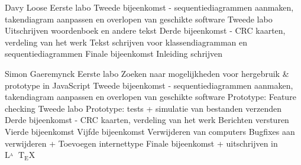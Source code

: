 \documentclass[a4paper,oneside]{report}
\def\latex{$\mathrm{L\!\!^{{}_{\scriptstyle A}} \!\!\!\!\!\;\; T\!_{\displaystyle E} \!
X}$}
\begin{document}
\begin{studentlog}{Davy Loose}
{Eerste labo}
{Tweede bijeenkomst - sequentiediagrammen aanmaken, takendiagram aanpassen en overlopen van geschikte software}
{Tweede labo}
{Uitschrijven woordenboek en andere tekst}
{Derde bijeenkomst - CRC kaarten, verdeling van het werk}
{Tekst schrijven voor klassendiagramman en sequentiediagrammen}
{Finale bijeenkomst}
{Inleiding schrijven}
\end{studentlog}

\begin{studentlog}{Simon Gaeremynck}
{Eerste labo}
{Zoeken naar mogelijkheden voor hergebruik \& prototype in JavaScript}
{Tweede bijeenkomst - sequentiediagrammen aanmaken, takendiagram aanpassen en overlopen van geschikte software}
{Prototype: Feature checking}
{Tweede labo}
{Prototype: tests + simulatie van bestanden verzenden}
{Derde bijeenkomst - CRC kaarten, verdeling van het werk}
{Berichten versturen}
{Vierde bijeenkomst}
{Vijfde bijeenkomst}
{Verwijderen van computers}
{Bugfixes aan verwijderen + Toevoegen internettype}
{Finale bijeenkomst + uitschrijven in \latex}
\end{studentlog}
\end{document}
